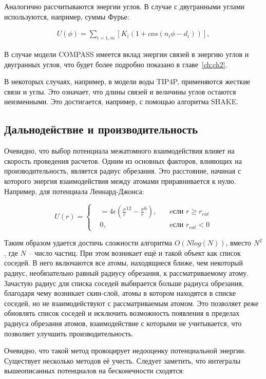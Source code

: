 Аналогично рассчитываются энергии углов. В случае с двугранными углами используются, например, суммы Фурье:

\begin{align}
	U(\phi) = \sum_{i=1, m}[K_i(1+cos(n_i\phi - d_i))],
\end{align}

В случае модели COMPASS имеется вклад энергии связей в энергию углов и двугранных углов, что будет более подробно показано в главе~\cref{ch:ch2}.

В некоторых случаях, например, в модели воды TIP4P, применяются жесткие связи и углы. Это означает, что длины связей и величины углов остаются неизменными. Это достигается, например, с помощью алгоритма SHAKE. 

\subsection{Дальнодействие и производительность}

Очевидно, что выбор потенциала межатомного взаимодействия влияет на скорость проведения расчетов. Одним из основных факторов, влияющих на производительность, является радиус обрезания. Это расстояние, начиная с которого энергия взаимодействия между атомами приравнивается к нулю. Например, для потенциала Леннард-Джонса:

\[
U(r) = \left\{
\begin{alignedat}{2}
    &= 4 \epsilon (\frac{\sigma}{r}^{12}-\frac{\sigma}{r}^6), \quad &\text{eсли } r\geqslant r_{cut} \\
    &0, \quad & \text{eсли } r_{cut}<0
\end{alignedat}
\right.
\]

Таким образом удается достичь сложности алгоритма $O(Nlog(N))$, вместо $N^2$, где $N$ \--- число частиц. При этом возникает ещё и такой объект как список соседей. В него включаются все атомы, находящиеся ближе, чем некоторый радиус, необязательно равный радиусу обрезания, к рассматриваемому атому. Зачастую радиус для списка соседей выбирается больше радиуса обрезания, благодаря чему возникает скин-слой, атомы в котором находятся в списке соседей, но не взаимодействуют с рассматриваемым атомом. Это позволяет реже обновлять список соседей и исключить возможность появления в пределах радиуса обрезания атомов, взаимодействие с которыми не учитывается, что позволяет улучшить производительность.  

Очевидно, что такой метод провоцирует недооценку потенциальной энергии. Существует несколько методов её учесть. Следует заметить, что интегралы вышеописанных потенциалов на бесконечности сходятся:

